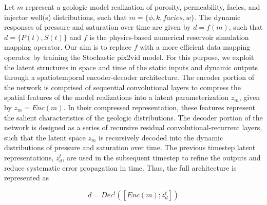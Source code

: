 \documentclass[10pt, twoside]{article}
\begin{document}
Let $m$ represent a geologic model realization of porosity, permeability, facies, and injector well(s) distributions, such that $m = \{\phi,k,facies,w\}$. The dynamic responses of pressure and saturation over time are given by $d=f(m)$, such that $d=\{P(t), S(t)\}$ and $f$ is the physics-based numerical reservoir simulation mapping operator. Our aim is to replace $f$ with a more efficient data mapping operator by training the Stochastic pix2vid model. For this purpose, we exploit the latent structures in space and time of the static inputs and dynamic outputs through a spatiotemporal encoder-decoder architecture. The encoder portion of the network is comprised of sequential convolutional layers to compress the spatial features of the model realizations into a latent parameterization $z_m$, given by $z_m=Enc(m)$. In their compressed representation, these features represent the salient characteristics of the geologic distributions. The decoder portion of the network is designed as a series of recursive residual convolutional-recurrent layers, such that the latent space $z_m$ is recursively decoded into the dynamic distributions of pressure and saturation over time. The previous timestep latent representations, $z_d^t$, are used in the subsequent timestep to refine the outputs and reduce systematic error propagation in time. Thus, the full architecture is represented as

\begin{equation} \label{eq6}
    d = Dec^t ( [ Enc(m) ; z_d^t ] )
\end{equation}
\end{document}
